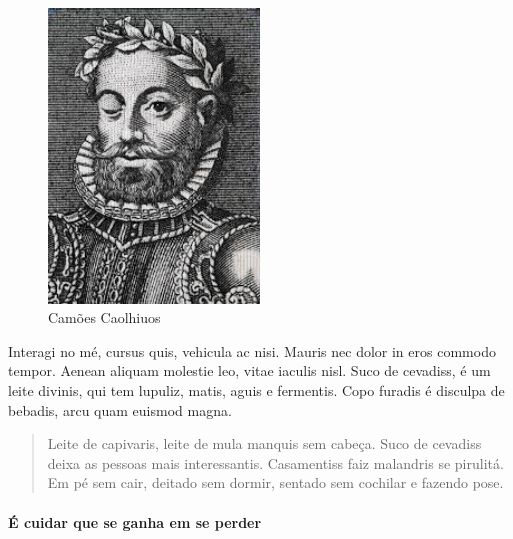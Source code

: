 
\begin{figure}[b!]
\centering
\includegraphics[width=0.5\textwidth]{image}
\caption{Camões Caolhiuos}
\label{fig:camoes}
\end{figure}

Interagi no mé, cursus quis, vehicula ac nisi. Mauris nec dolor in eros commodo
tempor. Aenean aliquam molestie leo, vitae iaculis nisl. Suco de cevadiss, é um
leite divinis, qui tem lupuliz, matis, aguis e fermentis. Copo furadis é
disculpa de bebadis, arcu quam euismod magna.


\begin{quote} 
Leite de capivaris, leite de mula manquis sem cabeça. Suco de
cevadiss deixa as pessoas mais interessantis. Casamentiss faiz malandris se
pirulitá. Em pé sem cair, deitado sem dormir, sentado sem cochilar e fazendo
pose.  
\end{quote}

\paragraph{É cuidar que se ganha em se perder}

